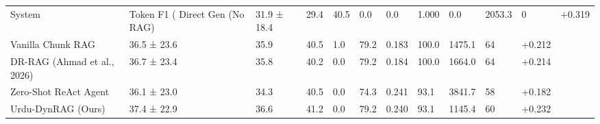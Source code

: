 \begin{tabular}{lllllllllll}
\toprule
System & Token F1 (%
\midrule
Direct Gen (No RAG) & 31.9 ± 18.4 & 29.4 & 40.5 & 0.0 & 0.0 & 1.000 & 0.0 & 2053.3 & 0 & +0.319 \\
Vanilla Chunk RAG & 36.5 ± 23.6 & 35.9 & 40.5 & 1.0 & 79.2 & 0.183 & 100.0 & 1475.1 & 64 & +0.212 \\
DR-RAG (Ahmad et al., 2026) & 36.7 ± 23.4 & 35.8 & 40.2 & 0.0 & 79.2 & 0.184 & 100.0 & 1664.0 & 64 & +0.214 \\
Zero-Shot ReAct Agent & 36.1 ± 23.0 & 34.3 & 40.5 & 0.0 & 74.3 & 0.241 & 93.1 & 3841.7 & 58 & +0.182 \\
Urdu-DynRAG (Ours) & 37.4 ± 22.9 & 36.6 & 41.2 & 0.0 & 79.2 & 0.240 & 93.1 & 1145.4 & 60 & +0.232 \\
\bottomrule
\end{tabular}
